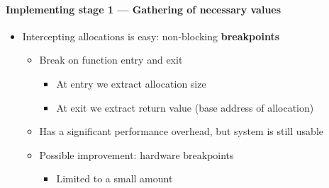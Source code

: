 \documentclass{i20lecture}
\begin{document}
\begin{frame}{\insertsection}
  \framesubtitle{Implementing stage 1 --- Gathering of necessary values}

    \begin{itemize}
	\item Intercepting allocations is easy: non-blocking \textbf{breakpoints}
     \begin{itemize}
\pause
      \item Break on function entry and exit
        \begin{itemize}
\pause
			\item At entry we extract allocation size
			\item At exit we extract return value (base address of allocation)
        \end{itemize}
\pause
      \item Has a significant performance overhead, but system is still usable
\pause
      \item Possible improvement: hardware breakpoints
\pause
        \begin{itemize}
			\item Limited to a small amount
        \end{itemize}
     \end{itemize}
    \end{itemize}
\end{frame}
\end{document}
